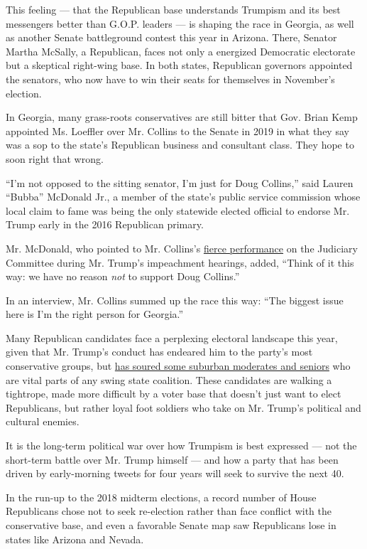 This feeling --- that the Republican base understands Trumpism and its
best messengers better than G.O.P. leaders --- is shaping the race in
Georgia, as well as another Senate battleground contest this year in
Arizona. There, Senator Martha McSally, a Republican, faces not only a
energized Democratic electorate but a skeptical right-wing base. In both
states, Republican governors appointed the senators, who now have to win
their seats for themselves in November's election.

In Georgia, many grass-roots conservatives are still bitter that Gov.
Brian Kemp appointed Ms. Loeffler over Mr. Collins to the Senate in 2019
in what they say was a sop to the state's Republican business and
consultant class. They hope to soon right that wrong.

``I'm not opposed to the sitting senator, I'm just for Doug Collins,''
said Lauren ``Bubba'' McDonald Jr., a member of the state's public
service commission whose local claim to fame was being the only
statewide elected official to endorse Mr. Trump early in the 2016
Republican primary.

Mr. McDonald, who pointed to Mr. Collins's
\href{https://www.youtube.com/watch?v=_p5X4aH2h9M}{fierce performance}
on the Judiciary Committee during Mr. Trump's impeachment hearings,
added, ``Think of it this way: we have no reason \emph{not} to support
Doug Collins.''

In an interview, Mr. Collins summed up the race this way: ``The biggest
issue here is I'm the right person for Georgia.''

Many Republican candidates face a perplexing electoral landscape this
year, given that Mr. Trump's conduct has endeared him to the party's
most conservative groups, but
\href{https://www.nytimes.com/2020/06/25/us/politics/trump-senate-republicans-poll.html}{has
soured some suburban moderates and seniors} who are vital parts of any
swing state coalition. These candidates are walking a tightrope, made
more difficult by a voter base that doesn't just want to elect
Republicans, but rather loyal foot soldiers who take on Mr. Trump's
political and cultural enemies.

It is the long-term political war over how Trumpism is best expressed
--- not the short-term battle over Mr. Trump himself --- and how a party
that has been driven by early-morning tweets for four years will seek to
survive the next 40.

In the run-up to the 2018 midterm elections, a record number of House
Republicans chose not to seek re-election rather than face conflict with
the conservative base, and even a favorable Senate map saw Republicans
lose in states like Arizona and Nevada.

